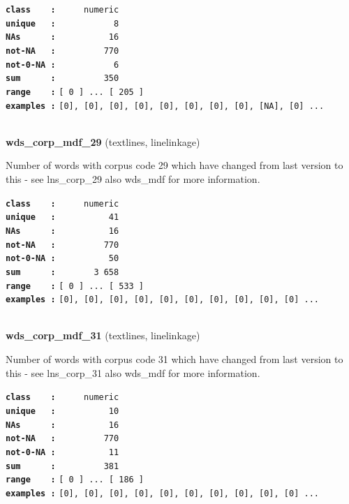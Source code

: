 \documentclass[]{article}
\begin{document}
\textbf{\texttt{class\ \ \ \ :}} \texttt{~~~~~numeric}\\
\textbf{\texttt{unique\ \ \ :}} \texttt{~~~~~~~~~~~8}\\
\textbf{\texttt{NAs\ \ \ \ \ \ :}} \texttt{~~~~~~~~~~16}\\
\textbf{\texttt{not-NA\ \ \ :}} \texttt{~~~~~~~~~770}\\
\textbf{\texttt{not-0-NA\ :}} \texttt{~~~~~~~~~~~6}\\
\textbf{\texttt{sum\ \ \ \ \ \ :}} \texttt{~~~~~~~~~350}\\
\textbf{\texttt{range\ \ \ \ :}}
\texttt{{[}\ 0\ {]}\ ...\ {[}\ 205\ {]}}\\
\textbf{\texttt{examples\ :}}
\texttt{{[}0{]},\ {[}0{]},\ {[}0{]},\ {[}0{]},\ {[}0{]},\ {[}0{]},\ {[}0{]},\ {[}0{]},\ {[}NA{]},\ {[}0{]}\ ...}\\

~

\textbf{wds\_corp\_mdf\_29} (textlines, linelinkage)

Number of words with corpus code 29 which have changed from last version
to this - see lns\_corp\_29 also wds\_mdf for more information.

\textbf{\texttt{class\ \ \ \ :}} \texttt{~~~~~numeric}\\
\textbf{\texttt{unique\ \ \ :}} \texttt{~~~~~~~~~~41}\\
\textbf{\texttt{NAs\ \ \ \ \ \ :}} \texttt{~~~~~~~~~~16}\\
\textbf{\texttt{not-NA\ \ \ :}} \texttt{~~~~~~~~~770}\\
\textbf{\texttt{not-0-NA\ :}} \texttt{~~~~~~~~~~50}\\
\textbf{\texttt{sum\ \ \ \ \ \ :}} \texttt{~~~~~~~3~658}\\
\textbf{\texttt{range\ \ \ \ :}}
\texttt{{[}\ 0\ {]}\ ...\ {[}\ 533\ {]}}\\
\textbf{\texttt{examples\ :}}
\texttt{{[}0{]},\ {[}0{]},\ {[}0{]},\ {[}0{]},\ {[}0{]},\ {[}0{]},\ {[}0{]},\ {[}0{]},\ {[}0{]},\ {[}0{]}\ ...}\\

~

\textbf{wds\_corp\_mdf\_31} (textlines, linelinkage)

Number of words with corpus code 31 which have changed from last version
to this - see lns\_corp\_31 also wds\_mdf for more information.

\textbf{\texttt{class\ \ \ \ :}} \texttt{~~~~~numeric}\\
\textbf{\texttt{unique\ \ \ :}} \texttt{~~~~~~~~~~10}\\
\textbf{\texttt{NAs\ \ \ \ \ \ :}} \texttt{~~~~~~~~~~16}\\
\textbf{\texttt{not-NA\ \ \ :}} \texttt{~~~~~~~~~770}\\
\textbf{\texttt{not-0-NA\ :}} \texttt{~~~~~~~~~~11}\\
\textbf{\texttt{sum\ \ \ \ \ \ :}} \texttt{~~~~~~~~~381}\\
\textbf{\texttt{range\ \ \ \ :}}
\texttt{{[}\ 0\ {]}\ ...\ {[}\ 186\ {]}}\\
\textbf{\texttt{examples\ :}}
\texttt{{[}0{]},\ {[}0{]},\ {[}0{]},\ {[}0{]},\ {[}0{]},\ {[}0{]},\ {[}0{]},\ {[}0{]},\ {[}0{]},\ {[}0{]}\ ...}\\
\end{document}
